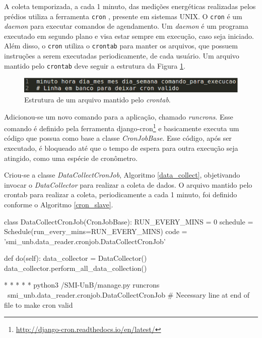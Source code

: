 A coleta temporizada, a cada 1 minuto, das medições energéticas realizadas pelos prédios utiliza a ferramenta \verb|cron| \cite{paul_cron}, presente em sistemas UNIX. O \verb|cron| é um \textit{daemon} para executar comandos de agendamento. Um \textit{daemon} é um programa executado em segundo plano e visa estar sempre em execução, caso seja iniciado. Além disso, o \verb|cron| utiliza o \verb|crontab| para manter os arquivos, que possuem instruções a serem executadas periodicamente, de cada usuário. Um arquivo mantido pelo \verb|crontab| deve seguir a estrutura da Figura \ref{crontab_12}.

\begin{figure}[!h]
    \centering
    \includegraphics[keepaspectratio=true,scale=0.7]{figuras/crontab.eps}
    \caption{Estrutura de um arquivo mantido pelo \textit{crontab}.}
    \label{crontab_12}
\end{figure}

Adicionou-se um novo comando para a aplicação, chamado \textit{runcrons}. Esse comando é definido pela ferramenta django-cron\footnote{\url{http://django-cron.readthedocs.io/en/latest/}} e basicamente executa um código que possua como base a classe \textit{CronJobBase}. Esse código, após ser executado, é bloqueado até que o tempo de espera para outra execução seja atingido, como uma espécie de cronômetro.

Criou-se a classe \textit{DataCollectCronJob}, Algoritmo \ref{data_collect}, objetivando invocar o \textit{DataCollector} para realizar a coleta de dados. O arquivo mantido pelo crontab para realizar a coleta, periodicamente a cada 1 minuto, foi definido conforme o Algoritmo \ref{cron_slave}.

\begin{python}[caption={Classe \textit{DataCollectCronJob}.}, captionpos=b, label={data_collect}]
class DataCollectCronJob(CronJobBase):
    RUN_EVERY_MINS = 0
    schedule = Schedule(run_every_mins=RUN_EVERY_MINS)
    code = 'smi_unb.data_reader.cronjob.DataCollectCronJob'

    def do(self):
        data_collector = DataCollector()
        data_collector.perform_all_data_collection()
\end{python}

\begin{python}[caption={\textit{Cron} para execução da coleta dos dados de energia.}, captionpos=b, label={cron_slave}]
* * * * * python3 /SMI-UnB/manage.py runcrons \
smi_unb.data_reader.cronjob.DataCollectCronJob
# Necessary line at end of file to make cron valid
\end{python}

